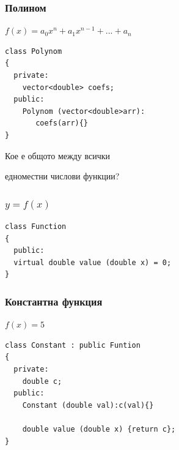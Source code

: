 \documentclass{beamer}
\begin{document}
\begin{frame}[fragile]
\frametitle{Полином}

\begin{center}

$f(x) = a_0x^n + a_1x^{n-1}+...+a_n$

\begin{lstlisting}
class Polynom
{
  private:
    vector<double> coefs;
  public:
    Polynom (vector<double>arr):
       coefs(arr){}
}
\end{lstlisting}
  
\end{center}


\end{frame}


\begin{frame}
\centerline{Кое е общото между всички}
\centerline{едноместни числови функции?}
\end{frame}



\begin{frame}[fragile]
\frametitle{$y=f(x)$}

\begin{center}

\begin{lstlisting}
class Function
{
  public:
  virtual double value (double x) = 0;
}
\end{lstlisting}
  
\end{center}


\end{frame}



\begin{frame}[fragile]
\frametitle{Константна функция}

\begin{center}

$f(x) = 5$

\begin{lstlisting}
class Constant : public Funtion
{
  private:
    double c;
  public:
    Constant (double val):c(val){}

    double value (double x) {return c};
}
\end{lstlisting}
  
\end{center}


\end{frame}
\end{document}

